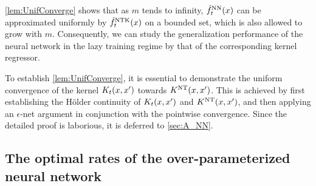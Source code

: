 \cref{lem:UnifConverge} shows that as $m$ tends to infinity, $\hat{f}^{\mathrm{NN}}_t(x)$ can be approximated uniformly by $\hat{f}^{\mathrm{NTK}}_t(x)$ on a bounded set, which is also allowed to grow with $m$.
Consequently, we can study the generalization performance of the neural network in the lazy training regime by that of the corresponding kernel regressor.


To establish \cref{lem:UnifConverge},
it is essential to demonstrate the uniform convergence of the kernel $K_t(x,x')$ towards $K^{\mathrm{NT}}(x,x')$.
This is achieved by first establishing the Hölder continuity of $K_t(x,x')$ and $K^{\mathrm{NT}}(x,x')$,
and then applying an $\epsilon$-net argument in conjunction with the pointwise convergence.
Since the detailed proof is laborious, it is deferred to \cref{sec:A_NN}.



\subsection{The optimal rates of the over-parameterized neural network}



